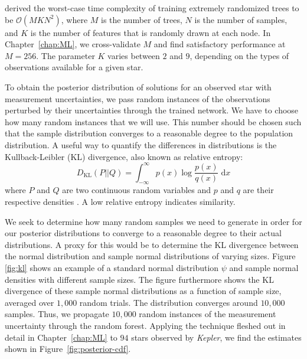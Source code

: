\citet[][]{louppe2014understanding} derived the worst-case time complexity of training extremely randomized trees to be ${\mathcal{O}(MKN^2)}$, where $M$ is the number of trees, $N$ is the number of samples, and $K$ is the number of features that is randomly drawn at each node. 
In Chapter~\ref{chap:ML}, we cross-validate $M$ and find satisfactory performance at ${M=256}$. 
The parameter $K$ varies between $2$ and $9$, depending on the types of observations available for a given star. 





To obtain the posterior distribution of solutions for an observed star with measurement uncertainties, we pass random instances of the observations perturbed by their uncertainties through the trained network. 
We have to choose how many random instances that we will use. 
This number should be chosen such that the sample distribution converges to a reasonable degree to the population distribution. 
A useful way to quantify the differences in distributions is the Kullback-Leibler (KL) divergence, also known as relative entropy: 
\begin{equation} \label{eq:KL}
    D_{\text{KL}} (P||Q) = \int_{-\infty}^\infty p(x) \log \frac{p(x)}{q(x)} \;\text{d}x
\end{equation}
where $P$ and $Q$ are two continuous random variables and $p$ and $q$ are their respective densities \citep{10.2307/2236703}. 
A low relative entropy indicates similarity. %

We seek to determine how many random samples we need to generate in order for our posterior distributions to converge to a reasonable degree to their actual distributions. 
A proxy for this would be to determine the KL divergence between the normal distribution and sample normal distributions of varying sizes. 
Figure \ref{fig:kl} shows an example of a standard normal distribution $\psi$ and sample normal densities with different sample sizes. 
The figure furthermore shows the KL divergence of these sample normal distributions as a function of sample size, averaged over $1,000$ random trials. 
The distribution converges around $10,000$ samples. 
Thus, we propagate $10,000$ random instances of the measurement uncertainty through the random forest. 
Applying the technique fleshed out in detail in Chapter~\ref{chap:ML} to $94$ stars observed by \emph{Kepler}, we find the estimates shown in Figure~\ref{fig:posterior-cdf}. 

